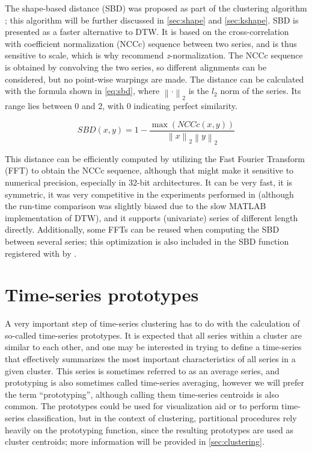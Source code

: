 The shape-based distance (SBD) was proposed as part of the \kshape{} clustering algorithm \citep{paparrizos2015};
this algorithm will be further discussed in \cref{sec:shape} and \cref{sec:kshape}.
SBD is presented as a faster alternative to DTW.
It is based on the cross-correlation with coefficient normalization (NCCc) sequence between two series,
and is thus sensitive to scale,
which is why \citet{paparrizos2015} recommend \textit{z}-normalization.
The NCCc sequence is obtained by convolving the two series,
so different alignments can be considered,
but no point-wise warpings are made.
The distance can be calculated with the formula shown in \cref{eq:sbd},
where $\left\lVert \cdot \right\rVert_2$ is the $l_2$ norm of the series.
Its range lies between 0 and 2, with 0 indicating perfect similarity.

\begin{equation}
\label{eq:sbd}
SBD(x,y) = 1 - \frac{\max \left( NCCc(x,y) \right)}{\left\lVert x \right\rVert_2 \left\lVert y \right\rVert_2}
\end{equation}

This distance can be efficiently computed by utilizing the Fast Fourier Transform (FFT) to obtain the NCCc sequence,
although that might make it sensitive to numerical precision,
especially in 32-bit architectures.
It can be very fast,
it is symmetric,
it was very competitive in the experiments performed in \citet{paparrizos2015}
(although the run-time comparison was slightly biased due to the slow MATLAB implementation of DTW),
and it supports (univariate) series of different length directly.
Additionally, some FFTs can be reused when computing the SBD between several series;
this optimization is also included in the SBD function registered with  by \dtwclust{}.

\section{Time-series prototypes}
\label{sec:prototypes}

A very important step of time-series clustering has to do with the calculation of so-called time-series prototypes.
It is expected that all series within a cluster are similar to each other,
and one may be interested in trying to define a time-series that effectively summarizes the most important characteristics of all series in a given cluster.
This series is sometimes referred to as an average series,
and prototyping is also sometimes called time-series averaging,
however we will prefer the term ``prototyping'',
although calling them time-series centroids is also common.
The prototypes could be used for visualization aid or to perform time-series classification,
but in the context of clustering,
partitional procedures rely heavily on the prototyping function,
since the resulting prototypes are used as cluster centroids;
more information will be provided in \cref{sec:clustering}.


